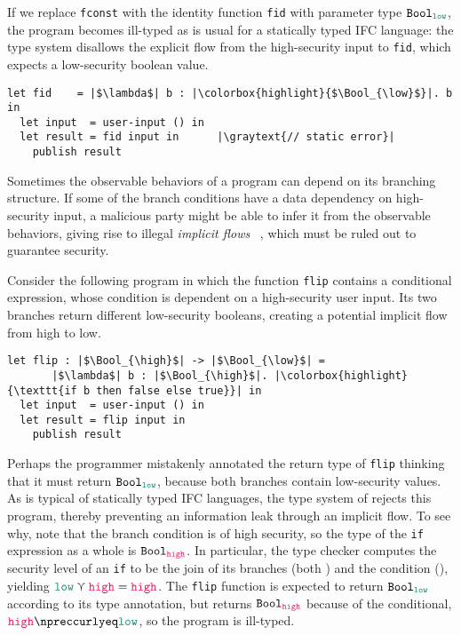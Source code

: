If we replace \texttt{fconst} with the identity function \texttt{fid} with
parameter type $\Bool_{\low}$, the program becomes ill-typed as is usual for a
statically typed IFC language: the type system disallows the explicit flow from
the high-security input to \texttt{fid}, which expects a low-security boolean
value.

\begin{lstlisting}[style=tt]
  let fid    = |$\lambda$| b : |\colorbox{highlight}{$\Bool_{\low}$}|. b in
  let input  = user-input () in
  let result = fid input in      |\graytext{// static error}|
    publish result
\end{lstlisting}

Sometimes the observable behaviors of a program can depend on its branching
structure. If some of the branch conditions have a data dependency on
high-security input, a malicious party might be able to infer it from the
observable behaviors, giving rise to illegal \textit{implicit flows}
~\parencite{denning1976lattice}, which must be ruled out to guarantee security.

Consider the following program in which the function \texttt{flip} contains a
conditional expression, whose condition is dependent on a high-security user
input. Its two branches return different low-security booleans, creating a
potential implicit flow from high to low.

\begin{lstlisting}[style=tt]
  let flip : |$\Bool_{\high}$| -> |$\Bool_{\low}$| =
       |$\lambda$| b : |$\Bool_{\high}$|. |\colorbox{highlight}{\texttt{if b then false else true}}| in
  let input  = user-input () in
  let result = flip input in
    publish result
\end{lstlisting}

\noindent Perhaps the programmer mistakenly annotated the return type of
\texttt{flip} thinking that it must return $\Bool_{\low}$, because both branches
contain low-security values. As is typical of statically typed IFC languages,
the type system of \Surface rejects this program, thereby preventing an
information leak through an implicit flow. To see why, note that the branch
condition is of high security, so the type of the \texttt{if} expression as a
whole is $\Bool_{\high}$. In particular, the type checker computes the security
level of an \texttt{if} to be the join of its branches (both \low) and the
condition (\high), yielding $\low \curlyvee \high = \high$. The \texttt{flip}
function is expected to return $\Bool_{\low}$ according to its type annotation,
but returns $\Bool_{\high}$ because of the conditional, $\high \npreccurlyeq
\low$, so the program is ill-typed.

